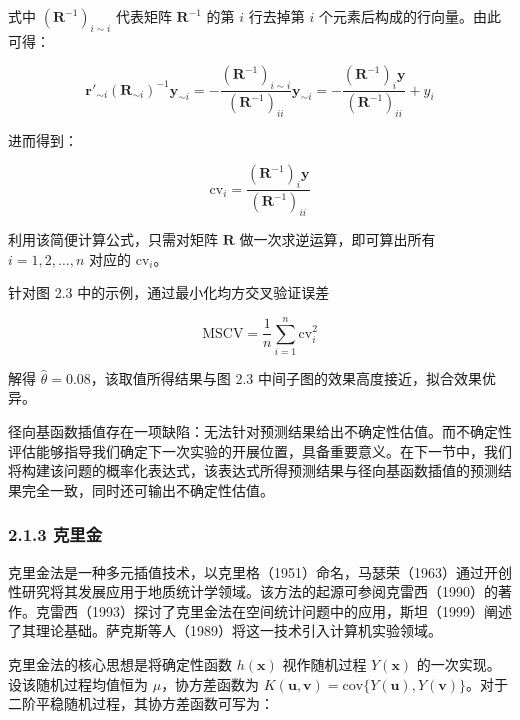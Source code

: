 \documentclass{ctexart}
\begin{document}
式中 $(\boldsymbol{R}^{-1})_{i\sim i}$ 代表矩阵 $\boldsymbol{R}^{-1}$ 的第 $i$ 行去掉第 $i$ 个元素后构成的行向量。由此可得：

\begin{equation*}
\boldsymbol{r}'_{\sim i}(\boldsymbol{R}_{\sim i})^{-1}\boldsymbol{y}_{\sim i}=-\frac{(\boldsymbol{R}^{-1})_{i\sim i}}{(\boldsymbol{R}^{-1})_{ii}}\boldsymbol{y}_{\sim i}=-\frac{(\boldsymbol{R}^{-1})_i\boldsymbol{y}}{(\boldsymbol{R}^{-1})_{ii}}+y_i
\end{equation*}

进而得到：

\begin{equation*}
\mathrm{cv}_i=\frac{(\boldsymbol{R}^{-1})_i\boldsymbol{y}}{(\boldsymbol{R}^{-1})_{ii}}
\tag{2.9}
\end{equation*}

利用该简便计算公式，只需对矩阵 $\boldsymbol{R}$ 做一次求逆运算，即可算出所有 $i=1,2,\dots,n$ 对应的 $\mathrm{cv}_i$。

针对图 2.3 中的示例，通过最小化均方交叉验证误差

\begin{equation*}
\mathrm{MSCV}=\frac{1}{n}\sum_{i=1}^{n}\mathrm{cv}_i^2
\tag{2.10}
\end{equation*}

解得 $\widehat{\theta}=0.08$，该取值所得结果与图 2.3 中间子图的效果高度接近，拟合效果优异。

径向基函数插值存在一项缺陷：无法针对预测结果给出不确定性估值。而不确定性评估能够指导我们确定下一次实验的开展位置，具备重要意义。在下一节中，我们将构建该问题的概率化表达式，该表达式所得预测结果与径向基函数插值的预测结果完全一致，同时还可输出不确定性估值。

\subsubsection*{2.1.3 克里金}

克里金法是一种多元插值技术，以克里格（1951）命名，马瑟荣（1963）通过开创性研究将其发展应用于地质统计学领域。该方法的起源可参阅克雷西（1990）的著作。克雷西（1993）探讨了克里金法在空间统计问题中的应用，斯坦（1999）阐述了其理论基础。萨克斯等人（1989）将这一技术引入计算机实验领域。

克里金法的核心思想是将确定性函数 $h(\boldsymbol{x})$ 视作随机过程 $Y(\boldsymbol{x})$ 的一次实现。设该随机过程均值恒为 $\mu$，协方差函数为 $K(\boldsymbol{u},\boldsymbol{v})=\mathrm{cov}\{Y(\boldsymbol{u}),Y(\boldsymbol{v})\}$。对于二阶平稳随机过程，其协方差函数可写为：
\end{document}
